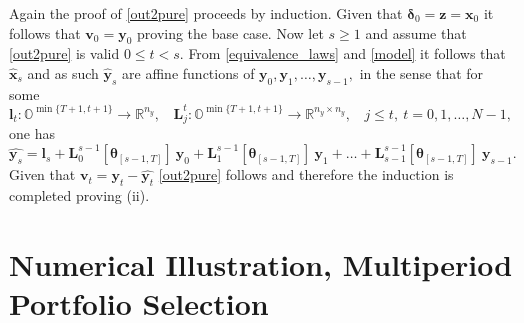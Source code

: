 \documentclass[letterpaper,11pt]{article}
\begin{document}
Again the proof of \eqref{out2pure} proceeds by induction. 
Given that $ \bm{\delta}_0  =  \mathbf{z} = \mathbf{x}_0$ it follows that
$ \mathbf{v}_0 = \mathbf{y}_0$ proving the base case. Now let $ s \geq 1$ and assume that \eqref{out2pure} is valid $ 0 \leq t < s$. 
From \eqref{equivalence_laws} and \eqref{model} it follows that  $\hat{\mathbf{x}}_s$ and as such  $\hat{\mathbf{y}}_s$
are affine functions of $ \mathbf{y}_0, \mathbf{y}_1, \hdots, \mathbf{y}_{s-1},$ in the sense that for some 
$$
\mathbf{l}_{t} :  \mathbb{O}^{\min{\{T+1,t+1\}}} \rightarrow \mathbb{R}^{n_y},~~~~ 
\mathbf{L}_j^t :  \mathbb{O}^{\min{\{T+1,t+1\}}} \rightarrow \mathbb{R}^{n_y \times n_y},
~~~~j \leq t, ~ t =0,1, \hdots, N-1,
$$
one has 
$$
\hat{\mathbf{y}_s} = \mathbf{l}_{s} + 
\mathbf{L}_0^{s-1}[\bm{\theta}_{[s-1,T]}] ~ \mathbf{y}_0 + 
\mathbf{L}_1^{s-1}[\bm{\theta}_{[s-1,T]}] ~ \mathbf{y}_1 + \hdots + \mathbf{L}_{s-1}^{s-1}[\bm{\theta}_{[s-1,T]}] ~ \mathbf{y}_{s-1}.
$$
Given that $\mathbf{v}_t =\mathbf{y}_t - \hat{\mathbf{y}_t}  $ \eqref{out2pure}
follows and therefore the induction is completed proving (ii). 








\section{Numerical Illustration, Multiperiod Portfolio Selection }
\end{document}
